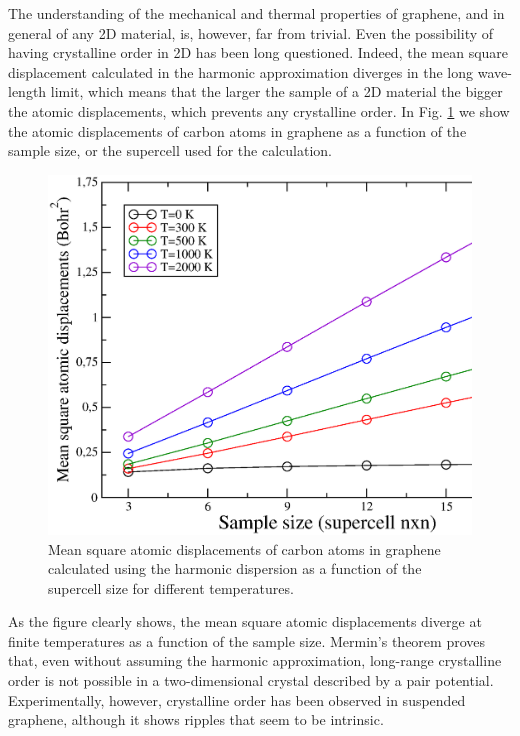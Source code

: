 The understanding of the mechanical and thermal properties of graphene, and in general of any 2D material, 
is, however, far from trivial. Even the possibility of having crystalline order in 2D has been long 
questioned\cite{landau_statistical_physics,mermin1968crystalline}. Indeed, the mean square displacement calculated 
in the harmonic approximation diverges in the long wave-length limit, which means that the larger the sample of a 2D 
material the bigger the atomic displacements, which prevents any crystalline order\cite{landau_statistical_physics}. 
In Fig. \ref{rms_harmonic} we show the atomic displacements of carbon atoms in graphene as a function of the sample 
size, or the supercell used for the calculation.
\begin{figure}[h]
\includegraphics[width=0.8\linewidth]{Figures/rms-harmonic.eps}
\caption[Mean square atomic displacements of carbon atoms in graphene calculated using the harmonic dispersion]{Mean 
	square atomic displacements of carbon atoms in graphene calculated using the harmonic dispersion as a 
	function of the supercell size for different temperatures.}
\label{rms_harmonic}
\end{figure}
As the figure clearly shows, the mean square atomic displacements diverge at finite temperatures as a function of 
the sample size. Mermin's theorem\cite{mermin1968crystalline} proves that, even without assuming the harmonic 
approximation, long-range crystalline order is not possible in a two-dimensional crystal described by a pair 
potential. Experimentally, however, crystalline order has been observed in suspended 
graphene\cite{meyer2007structure}, although it shows ripples that seem to be intrinsic\cite{fasolino2007intrinsic}. \\


